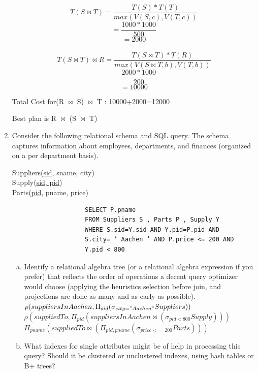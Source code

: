 \documentclass[10pt]{article}
\begin{document}
\begin{enumerate}
	\[ T(S \bowtie T)=\frac{T(S) * T(T) }{max(V(S,c),V(T,c))} \] 	\[ =\frac{1000 * 1000 }{500} \] \[ =2000 \] \\
	\[ T(S \bowtie T) \bowtie R=\frac{T(S \bowtie T) * T(R) }{max(V(S \bowtie T,b),V(T,b))} \] 	\[ =\frac{2000 * 1000 }{200} \] \[ =10000 \] 
	
	Total Cost for(R $\bowtie$ S) $\bowtie$ T : 10000+2000=12000
	
	Best plan is R $\bowtie$ (S $\bowtie$ T)

			\item Consider the following relational schema and SQL query. The schema captures information
			about employees, departments, and finances (organized on a per department basis).
			
				\bigskip
				\begin{addmargin}[0.30\textwidth]{4em}
					Suppliers(\underline{sid}, sname, city)\\
					Supply(\underline{sid, pid})\\
					Parts(\underline{pid}, pname, price)
				\end{addmargin}
				
				\begin{lstlisting}
					SELECT P.pname
					FROM Suppliers S , Parts P , Supply Y
					WHERE S.sid=Y.sid AND Y.pid=P.pid AND
					S.city= ’ Aachen ’ AND P.price <= 200 AND
					Y.pid < 800
				\end{lstlisting}
				
				\begin{enumerate}[(a)]
					\item Identify a relational algebra tree (or a relational algebra expression if you prefer) that
					reflects the order of operations a decent query optimizer would choose (applying the
					heuristics selection before join, and projections are done as many and as early as possible).\\
					
					$ \rho(suppliersInAachen,
					\Pi_{sid}( \sigma_{city="Aachen"} Suppliers) ) $\\
					
					$ \rho(suppliedTo, 
					\Pi_{pid}( suppliersInAachen \bowtie (\sigma_{pid < 800}Supply)) ) $\\
					
					$\Pi_{pname}( suppliedTo \bowtie (\Pi_{pid, pname}(\sigma_{price <= 200}Parts)) )$
					\bigskip
					
					\item What indexes for single attributes might be of help in processing this query? Should it
					be clustered or unclustered indexes, using hash tables or B+ trees?
					\bigskip
					

\end{enumerate}
\end{enumerate}
\end{document}
